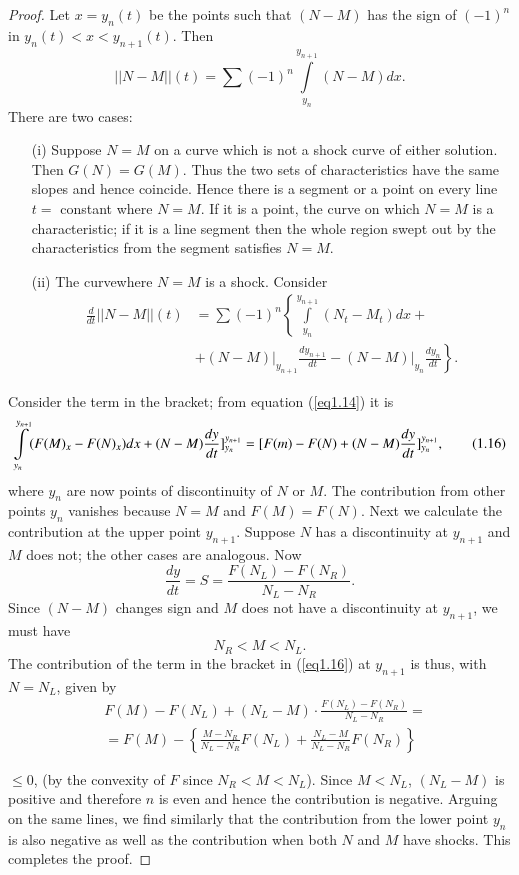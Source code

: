 \begin{proof}
Let $x = y_n(t)$ be the points such that $(N-M)$ has the sign of $(-1)^n$ in $y_n(t) < x < y_{n+1} (t)$. Then 
$$
|| N - M|| (t) = \sum (-1)^n \int\limits^{y_{n+1}}_{y_n} (N-M) dx.
$$
There are two cases:
\begin{itemize}
\item[{\rm (i)}] Suppose $N = M$ on a curve which is not a shock curve of either solution. Then $G(N) = G(M)$. Thus the two sets of characteristics have the same slopes and hence coincide. Hence there is a segment or a point on every line $t = $ constant where $N = M$. If it is a point, the curve on which $N=M$ is a characteristic; if it is a line segment then the whole region swept out by the characteristics from the segment satisfies $N=M$.

\item[{\rm (ii)}] The curve\pageoriginale where $N=M$ is a shock. Consider 
\begin{align*}
\frac{d}{dt} || N-M|| (t) & = \sum (-1)^n \left\{ \int\limits^{y_{n+1}}_{y_n} (N_t - M_t) dx + \right. \\
& \left. + (N-M) \big|_{y_{n+1}} \frac{dy_{n+1}}{dt} - (N-M) \big|_{y_n} \frac{dy_n}{dt} \right\}.  
\end{align*}
\end{itemize}

Consider the term in the bracket; from equation (\ref{eq1.14}) it is 
\begin{equation*}
\int\limits^{y_{n+1}}_{y_n} (F(M)_x - F(N)_x) dx + (N-M) \frac{dy}{dt}]^{y_{n+1}}_{y_n} \\
= [F(m) - F(N) + (N-M) \frac{dy}{dt}]^{y_{n+1}}_{y_n}, \tag{1.16}\label{eq1.16}
\end{equation*}
where $y_n$ are now points of discontinuity of $N$ or $M$. The contribution from other points $y_n$ vanishes because $N=M$ and $F(M) = F(N)$. Next we calculate the contribution at the upper point $y_{n+1}$. Suppose $N$ has a discontinuity at $y_{n+1}$ and $M$ does not; the other cases are analogous. Now
$$
\frac{dy}{dt} = S = \frac{F(N_L) - F(N_R)}{N_L - N_R}.
$$
Since $(N-M)$ changes sign and $M$ does not have a discontinuity at $y_{n+1}$, we must have 
$$
N_R < M < N_L. 
$$
The contribution of the term in the bracket in (\ref{eq1.16}) at $y_{n+1}$ is thus, with $N=N_L$, given by 
\begin{align*}
& F (M) - F (N_L) + (N_L - M) \cdot \frac{F(N_L) - F(N_R)}{N_L - N_R} = \\
& = F(M) - \left\{ \frac{M-N_R}{N_L - N_R} F (N_L) + \frac{N_L - M}{N_L - N_R} F(N_R)\right\}
\end{align*}\pageoriginale

$\leq 0$, (by the convexity of $F$ since $N_R < M < N_L$). Since $M < N_L$, $(N_L - M)$ is positive and therefore $n$ is even and hence the contribution is negative. Arguing on the same lines, we find similarly that the contribution from the lower point $y_n$ is also negative as well as the contribution when both $N$ and $M$ have shocks. This completes the proof. 
\end{proof}


